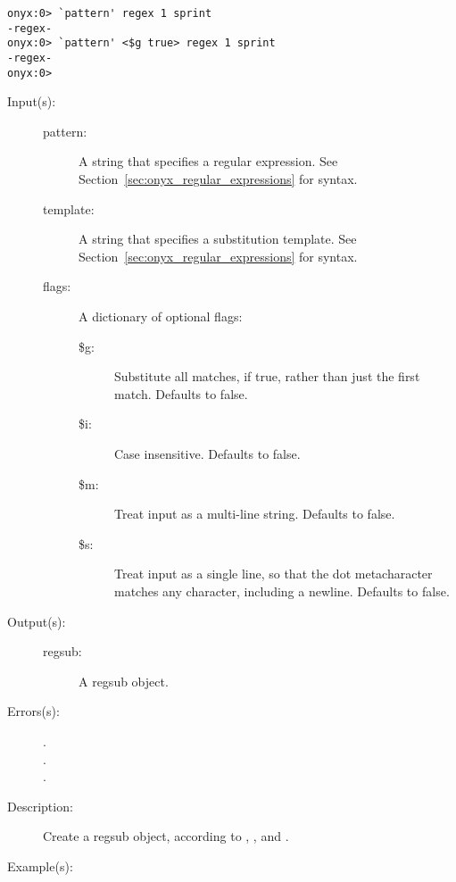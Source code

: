 \begin{description}
\begin{description}
\begin{verbatim}
onyx:0> `pattern' regex 1 sprint
-regex-
onyx:0> `pattern' <$g true> regex 1 sprint
-regex-
onyx:0>
		\end{verbatim}
	\end{description}
\label{systemdict:regsub}
\item[{\onyxop{pattern template flags}{regsub}{regsub}}: ]
\item[{\onyxop{pattern template}{regsub}{regsub}}: ]
	\begin{description}\item[]
	\item[Input(s): ]
		\begin{description}\item[]
		\item[pattern: ]
			A string that specifies a regular expression.  See
			Section~\ref{sec:onyx_regular_expressions} for syntax.
		\item[template: ]
			A string that specifies a substitution template.  See
			Section~\ref{sec:onyx_regular_expressions} for syntax.
		\item[flags: ]
			A dictionary of optional flags:
			\begin{description}%
			\item[\$g: ]
				Substitute all matches, if true, rather than
				just the first match.  Defaults to false.
			\item[\$i: ] Case insensitive.  Defaults to false.
			\item[\$m: ] Treat input as a multi-line string.
				Defaults to false.
			\item[\$s: ] Treat input as a single line, so that
				the dot metacharacter matches any character,
				including a newline.  Defaults to false.
			\end{description}
		\end{description}
	\item[Output(s): ]
		\begin{description}\item[]
		\item[regsub: ]
			A regsub object.
		\end{description}
	\item[Errors(s): ]
		\begin{description}\item[]
		\item[.]
		\item[.]
		\item[.]
		\end{description}
	\item[Description: ]
		Create a regsub object, according to ,
		, and .
	\item[Example(s): ]\begin{verbatim}


\end{verbatim}
\end{description}
\end{description}
